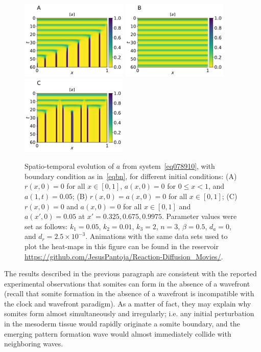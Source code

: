 \documentclass[%
 preprint,
 amsmath,amssymb,
 aps,
]{revtex4-2}
\begin{document}
	\begin{figure}[t!]
		\centering
		\includegraphics[width=2in]{Figures/Fig02aRev.pdf}
		\includegraphics[width=2in]{Figures/Fig02bRev.pdf}
		\includegraphics[width=2in]{Figures/Fig02cRev.pdf}
		\caption{Spatio-temporal evolution of $a$ from system~\eqref{eq078910}, with
			boundary condition as in~\eqref{eqbn}, for different initial conditions: (A)
			$r(x, 0)=0$ for all $x\in[0,1]$, $a(x, 0)=0$ for $0\leq x<1$, and $a(1, t) =
			0.05$; (B) $r(x, 0) = a(x, 0)=0$ for all $x\in[0,1]$; (C) $r(x, 0)=0$ and $a(x,
			0)=0$ for all $x\in[0,1]$ and $a(x',0)=0.05$ at $x'=0.325, 0.675, 0.9975$.
			Parameter values were set as follows: $k_1=0.05$, $k_2=0.01$, $k_3=2$, $n=3$,
			$\beta=0.5$, $d_a=0$, and $d_r=2.5\times10^{-3}$. Animations with the same 
			data sets used to plot the heat-maps in this figure can be found in the 
			reservoir \url{https://github.com/JesusPantoja/Reaction-Diffusion_Movies/}.}
		\label{Fig02}
	\end{figure}
	
	The results described in the previous paragraph are consistent with the reported
	experimental observations that somites can form in the absence of a wavefront
	(recall that somite formation in the absence of a wavefront is incompatible with 
	the clock and wavefront paradigm). As a matter of fact, they may explain why somites 
	form almost simultaneously and irregularly; i.e. any initial perturbation in the 
	mesoderm tissue would rapidly originate a somite boundary, and the emerging pattern 
	formation wave would almost immediately collide with neighboring waves. 
	
\end{document}
